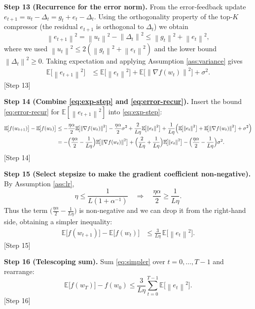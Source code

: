 \documentclass{article}
\newcommand{\E}{\mathbb{E}}
\newcommand{\norm}[1]{\left\|#1\right\|}
\begin{document}
\bigskip
\noindent\textbf{Step 13 (Recurrence for the error norm).}  
From the error‑feedback update $e_{t+1}=u_t-\Delta_t = g_t+e_t-\Delta_t$. Using the orthogonality property of the top‑$K$ compressor (the residual $e_{t+1}$ is orthogonal to $\Delta_t$) we obtain
\[
\norm{e_{t+1}}^{2}= \norm{u_t}^{2}-\norm{\Delta_t}^{2}
                 \le \norm{g_t}^{2}+\norm{e_t}^{2},
\]
where we used $\norm{u_t}^{2}\le 2(\norm{g_t}^{2}+\norm{e_t}^{2})$ and the lower bound $\norm{\Delta_t}^{2}\ge0$. Taking expectation and applying Assumption \ref{ass:variance} gives
\begin{align}
\E\!\bigl[\norm{e_{t+1}}^{2}\bigr]
&\le \E\!\bigl[\norm{e_t}^{2}\bigr] + \E\!\bigl[\norm{\nabla f(w_t)}^{2}\bigr] + \sigma^{2}. \label{eq:error-recur}
\end{align}
[Step 13]

\bigskip
\noindent\textbf{Step 14 (Combine \eqref{eq:exp-step} and \eqref{eq:error-recur}).}  
Insert the bound \eqref{eq:error-recur} for $\E[\norm{e_{t+1}}^{2}]$ into \eqref{eq:exp-step}:
\begin{align}
\E\!\bigl[f(w_{t+1})\bigr]-\E\!\bigl[f(w_t)\bigr]
&\le -\frac{\eta\alpha}{2}\E\!\bigl[\norm{\nabla f(w_t)}^{2}\bigr]
   -\frac{\eta\alpha}{2}\sigma^{2}
   +\frac{2}{L\eta}\E\!\bigl[\norm{e_t}^{2}\bigr]
   +\frac{1}{L\eta}\Bigl(\E\!\bigl[\norm{e_t}^{2}\bigr]
                      +\E\!\bigl[\norm{\nabla f(w_t)}^{2}\bigr]
                      +\sigma^{2}\Bigr) \nonumber\\
&= -\Bigl(\frac{\eta\alpha}{2}-\frac{1}{L\eta}\Bigr)\E\!\bigl[\norm{\nabla f(w_t)}^{2}\bigr]
   +\Bigl(\frac{2}{L\eta}+\frac{1}{L\eta}\Bigr)\E\!\bigl[\norm{e_t}^{2}\bigr]
   -\Bigl(\frac{\eta\alpha}{2}-\frac{1}{L\eta}\Bigr)\sigma^{2}. \label{eq:combined}
\end{align}
[Step 14]

\bigskip
\noindent\textbf{Step 15 (Select stepsize to make the gradient coefficient non‑negative).}  
By Assumption \ref{ass:lr},
\[
\eta \le \frac{1}{L(1+\alpha^{-1})}
\quad\Longrightarrow\quad
\frac{\eta\alpha}{2}\ge \frac{1}{L\eta}.
\]
Thus the term $\bigl(\frac{\eta\alpha}{2}-\frac{1}{L\eta}\bigr)$ is non‑negative and we can drop it from the right‑hand side, obtaining a simpler inequality:
\begin{align}
\E\!\bigl[f(w_{t+1})\bigr]-\E\!\bigl[f(w_t)\bigr]
&\le \frac{3}{L\eta}\,\E\!\bigl[\norm{e_t}^{2}\bigr]. \label{eq:simpler}
\end{align}
[Step 15]

\bigskip
\noindent\textbf{Step 16 (Telescoping sum).}  
Sum \eqref{eq:simpler} over $t=0,\dots,T-1$ and rearrange:
\[
\E\!\bigl[f(w_T)\bigr]-f(w_0)
\le \frac{3}{L\eta}\sum_{t=0}^{T-1}\E\!\bigl[\norm{e_t}^{2}\bigr].
\tag{3}
\]
[Step 16]
\end{document}
